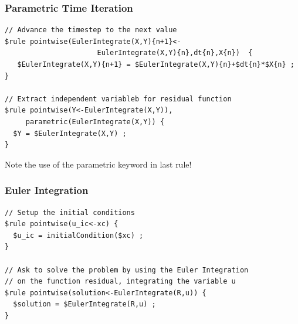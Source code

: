 \documentclass{beamer}
\begin{document}
\begin{frame}[fragile=singleslide]\frametitle{Parametric Time Iteration}
\scriptsize
\begin{verbatim}
// Advance the timestep to the next value
$rule pointwise(EulerIntegrate(X,Y){n+1}<-
                      EulerIntegrate(X,Y){n},dt{n},X{n})  {
   $EulerIntegrate(X,Y){n+1} = $EulerIntegrate(X,Y){n}+$dt{n}*$X{n} ;
}

// Extract independent variableb for residual function 
$rule pointwise(Y<-EulerIntegrate(X,Y)),
     parametric(EulerIntegrate(X,Y)) {
  $Y = $EulerIntegrate(X,Y) ;
}
\end{verbatim}

Note the use of the parametric keyword in last rule!
\end{frame}
\begin{frame}[fragile=singleslide]\frametitle{Euler Integration}
\scriptsize
\begin{verbatim}
// Setup the initial conditions
$rule pointwise(u_ic<-xc) {
  $u_ic = initialCondition($xc) ;
}

// Ask to solve the problem by using the Euler Integration 
// on the function residual, integrating the variable u
$rule pointwise(solution<-EulerIntegrate(R,u)) {
  $solution = $EulerIntegrate(R,u) ;
}
\end{verbatim}
\end{frame}%
\end{document}
